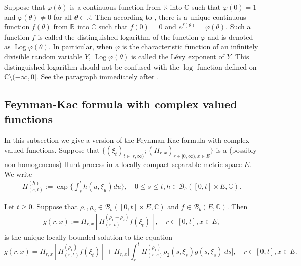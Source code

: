 \documentclass[EJP]{ejpecp} %
\begin{document}
Suppose that $\varphi(\theta)$ is a continuous function from $\mathbb R$ into $\mathbb C$ such that $\varphi(0) = 1$ and $\varphi(\theta) \neq 0$ for all $\theta \in \mathbb R$.
Then according to \cite[Lemma 7.6]{Sato2013Levy}, there is a unique continuous function $f(\theta)$ from $\mathbb R$ into $\mathbb C$ such that $f(0) = 0$ and $e^{f(\theta)} = \varphi(\theta)$.
Such a function $f$ is called the distinguished logarithm of the function $\varphi$ and is denoted as $\operatorname{Log} \varphi(\theta)$.
In particular, when $\varphi$ is the characteristic function of an infinitely divisible random variable $Y$,  $\operatorname{Log} \varphi(\theta)$ is called the L\'evy exponent of $Y$.
This distinguished logarithm should not be confused with the $\log$ function defined on $\mathbb C\setminus (-\infty, 0]$.
See the paragraph immediately after \cite[Lemma 7.6]{Sato2013Levy}.

\subsection{Feynman-Kac formula with complex valued functions}
\label{seq: complex Feynman-Kac transform}
In this subsection we give a version of the Feynman-Kac formula with complex valued functions.
Suppose that $\{(\xi_t)_{t \in [r,\infty)}; (\Pi_{r,x})_{r\in [0,\infty), x\in E}\}$ is a (possibly non-homogeneous) Hunt process in a locally compact separable metric space $E$.
We write
\begin{align}
  H^{(h)}_{(s,t)}
  := \exp\Big\{\int_s^t h(u,\xi_u) du\Big\},
  \quad 0 \leq s \leq t, h \in \mathcal B_b([0,t] \times E,\mathbb C).
\end{align}

\begin{lemma}
  \label{eq: complex FK}
  Let $t \geq 0$. Suppose that $\rho_1, \rho_2\in \mathcal B_b([0,t] \times E, \mathbb C)$ and $f\in \mathcal B_b(E, \mathbb C)$.
  Then
  \begin{align}
    \label{eq: expresion of g}
    g(r,x)
    := \Pi_{r,x}[ H_{(r,t)}^{(\rho_1+\rho_2)} f(\xi_t)],\quad r \in [0,t], x\in E,
  \end{align}
  is the unique locally bounded solution to the equation
  \[
    g(r,x)
    = \Pi_{r,x} [ H_{(r,t)}^{(\rho_1)} f(\xi_t)]+\Pi_{r,x} \Big[ \int_r^tH_{(r,s)}^{(\rho_1)}\rho_2(s,\xi_s) g(s,\xi_s)~ds \Big],\quad r \in [0,t], x\in E.
  \]
\end{lemma}
\end{document}
